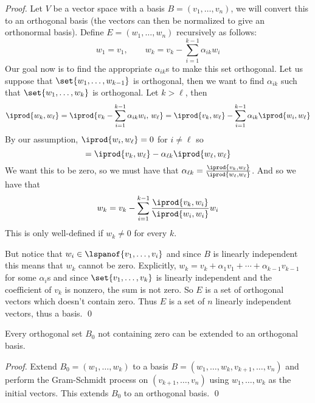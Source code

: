 \begin{proof}

    Let $V$ be a vector space with a basis $B=(v_1,\dots,v_n)$, we will convert this to an orthogonal basis (the vectors can then be normalized to give an orthonormal basis).
    Define $E=(w_1,\dots,w_n)$ recursively as follows:
    \[ w_1 = v_1,\qquad w_k = v_k - \sum_{i=1}^{k-1}\alpha_{ik}w_i \]
    Our goal now is to find the appropriate $\alpha_{ik}$s to make this set orthogonal.
    Let us suppose that $\set{w_1,\dots,w_{k-1}}$ is orthogonal, then we want to find $\alpha_{ik}$ such that $\set{w_1,\dots,w_k}$ is orthogonal.
    Let $k>\ell$, then
    \[ \iprod{w_k,w_\ell} = \iprod{v_k - \sum_{i=1}^{k-1}\alpha_{ik}w_i,\,w_\ell} = \iprod{v_k,w_\ell} - \sum_{i=1}^{k-1}\alpha_{ik}\iprod{w_i,w_\ell} \]
    By our assumption, $\iprod{w_i,w_\ell}=0$ for $i\neq\ell$ so
    \[ = \iprod{v_k,w_\ell} - \alpha_{\ell k}\iprod{w_\ell,w_\ell} \]
    We want this to be zero, so we must have that $\alpha_{\ell k}=\frac{\iprod{v_k,w_\ell}}{\iprod{w_\ell,w_\ell}}$.
    And so we have that
    \[ w_k = v_k - \sum_{i=1}^{k-1}\frac{\iprod{v_k,w_i}}{\iprod{w_i,w_i}}w_i \]
    This is only well-defined if $w_k\neq0$ for every $k$.

    But notice that $w_i\in\lspanof{v_1,\dots,v_i}$ and since $B$ is linearly independent this means that $w_k$ cannot be zero.
    Explicitly, $w_k=v_k+\alpha_1v_1+\cdots+\alpha_{k-1}v_{k-1}$ for some $\alpha_i$s and since $\set{v_1,\dots,v_k}$ is linearly independent and the coefficient of $v_k$ is nonzero, the sum is not zero.
    So $E$ is a set of orthogonal vectors which doesn't contain zero.
    Thus $E$ is a set of $n$ linearly independent vectors, thus a basis.
    \qed

\end{proof}

\begin{coro*}

    Every orthogonal set $B_0$ not containing zero can be extended to an orthogonal basis.

\end{coro*}

\begin{proof}

    Extend $B_0=(w_1,\dots,w_k)$ to a basis $B=(w_1,\dots,w_k,v_{k+1},\dots,v_n)$ and perform the Gram-Schmidt process on $(v_{k+1},\dots,v_n)$ using $w_1,\dots,w_k$ as the initial vectors.
    This extends $B_0$ to an orthogonal basis.
    \qed

\end{proof}

